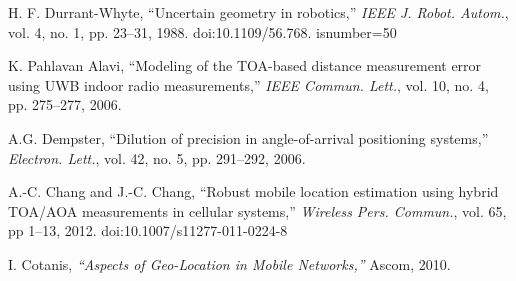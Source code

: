 \begin{thebibliography}{99}
H. F. Durrant-Whyte, ``Uncertain geometry in robotics,'' {\em IEEE J. Robot. Autom.}, vol. 4, no. 1, pp. 23--31, 1988. doi:10.1109/56.768. %
isnumber=50

K. Pahlavan Alavi, ``Modeling of the TOA-based distance measurement error using UWB indoor radio measurements,'' {\em IEEE Commun. Lett.}, vol. 10, no. 4, pp. 275--277, 2006.

A.G. Dempster, ``Dilution of precision in angle-of-arrival positioning systems,'' {\em Electron. Lett.}, vol. 42, no. 5, pp. 291--292, 2006.

A.-C. Chang and J.-C. Chang, ``Robust mobile location estimation using hybrid
TOA/AOA measurements in cellular systems,'' {\em Wireless Pers. Commun.}, vol. 65, pp 1--13, 2012. doi:10.1007/s11277-011-0224-8

I. Cotanis, {\em ``Aspects of Geo-Location in Mobile Networks,''} Ascom, 2010.

\end{thebibliography}